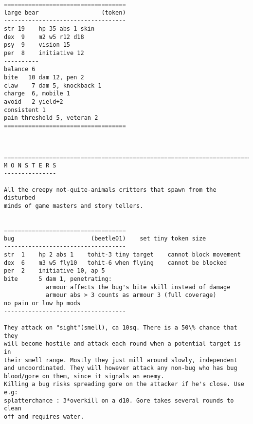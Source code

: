 \goodbreak \begin{samepage} \small \begin{verbatim}
===================================
large bear                  (token)
-----------------------------------
str 19    hp 35 abs 1 skin
dex  9    m2 w5 r12 d18
psy  9    vision 15
per  8    initiative 12
----------
balance 6
bite   10 dam 12, pen 2
claw    7 dam 5, knockback 1
charge  6, mobile 1
avoid   2 yield+2
consistent 1
pain threshold 5, veteran 2
===================================
\end{verbatim} \normalsize \end{samepage}

\







\goodbreak
{}

\goodbreak \begin{samepage} \small \begin{verbatim}
================================================================================
M O N S T E R S
---------------

All the creepy not-quite-animals critters that spawn from the disturbed
minds of game masters and story tellers.


===================================
bug                      (beetle01)    set tiny token size
-----------------------------------
str  1    hp 2 abs 1    tohit-3 tiny target    cannot block movement
dex  6    m3 w5 fly10   tohit-6 when flying    cannot be blocked
per  2    initiative 10, ap 5
bite      5 dam 1, penetrating:
            armour affects the bug's bite skill instead of damage
            armour abs > 3 counts as armour 3 (full coverage)
no pain or low hp mods
-----------------------------------

They attack on "sight"(smell), ca 10sq. There is a 50\% chance that they
will become hostile and attack each round when a potential target is in 
their smell range. Mostly they just mill around slowly, independent 
and uncoordinated. They will however attack any non-bug who has bug 
blood/gore on them, since it signals an enemy.
Killing a bug risks spreading gore on the attacker if he's close. Use e.g: 
splatterchance : 3*overkill on a d10. Gore takes several rounds to clean 
off and requires water.
\end{verbatim} \normalsize \end{samepage}

